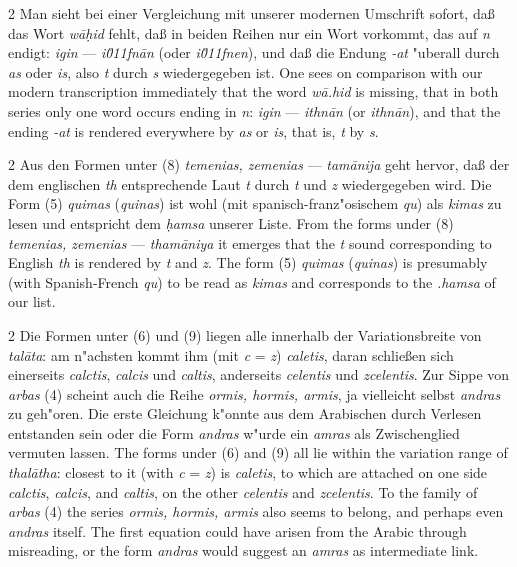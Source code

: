\documentclass[10pt,a4paper]{article}
\renewcommand{\switchcolumn}{\syncronize\nointerlineskip\columnbreak}
\begin{document}
\begin{paracol}{2}
Man sieht bei einer Vergleichung mit unserer modernen Umschrift sofort, da\ss{} das Wort \textit{w\=a\d{h}id} fehlt, da\ss{} in beiden Reihen nur ein Wort vorkommt, das auf \textit{n} endigt: \textit{igin} --- \textit{i\u011fn\=an} (oder \textit{i\u011fnen}), und da\ss{} die Endung \textit{-at} "uberall durch \textit{as} oder \textit{is}, also \textit{t} durch \textit{s} wiedergegeben ist.
\switchcolumn
One sees on comparison with our modern transcription immediately that the word \textit{w\=a.hid} is missing, that in both series only one word occurs ending in \textit{n}: \textit{igin} --- \textit{ithn\=an} (or \textit{ithn\=an}), and that the ending \textit{-at} is rendered everywhere by \textit{as} or \textit{is}, that is, \textit{t} by \textit{s}.
\end{paracol}

\begin{paracol}{2}
Aus den Formen unter (8) \textit{temenias, zemenias} --- \textit{tam\=anija} geht hervor, da\ss{} der dem englischen \textit{th} entsprechende Laut \textit{t} durch \textit{t} und \textit{z} wiedergegeben wird. Die Form (5) \textit{quimas} (\textit{quinas}) ist wohl (mit spanisch-franz"osischem \textit{qu}) als \textit{kimas} zu lesen und entspricht dem \textit{\d{h}amsa} unserer Liste.
\switchcolumn
From the forms under (8) \textit{temenias, zemenias} --- \textit{tham\=aniya} it emerges that the \textit{t} sound corresponding to English \textit{th} is rendered by \textit{t} and \textit{z}. The form (5) \textit{quimas} (\textit{quinas}) is presumably (with Spanish-French \textit{qu}) to be read as \textit{kimas} and corresponds to the \textit{.hamsa} of our list.
\end{paracol}

\begin{paracol}{2}
Die Formen unter (6) und (9) liegen alle innerhalb der Variationsbreite von \textit{tal\=ata}: am n"achsten kommt ihm (mit \textit{c} = \textit{z}) \textit{caletis}, daran schlie\ss{}en sich einerseits \textit{calctis}, \textit{calcis} und \textit{caltis}, anderseits \textit{celentis} und \textit{zcelentis}. Zur Sippe von \textit{arbas} (4) scheint auch die Reihe \textit{ormis, hormis, armis}, ja vielleicht selbst \textit{andras} zu geh"oren. Die erste Gleichung k"onnte aus dem Arabischen durch Verlesen entstanden sein oder die Form \textit{andras} w"urde ein \textit{amras} als Zwischenglied vermuten lassen.
\switchcolumn
The forms under (6) and (9) all lie within the variation range of \textit{thal\=atha}: closest to it (with \textit{c} = \textit{z}) is \textit{caletis}, to which are attached on one side \textit{calctis}, \textit{calcis}, and \textit{caltis}, on the other \textit{celentis} and \textit{zcelentis}. To the family of \textit{arbas} (4) the series \textit{ormis, hormis, armis} also seems to belong, and perhaps even \textit{andras} itself. The first equation could have arisen from the Arabic through misreading, or the form \textit{andras} would suggest an \textit{amras} as intermediate link.
\end{paracol}
\end{document}
